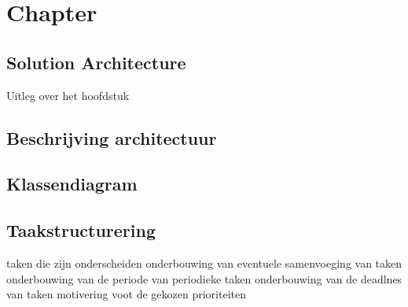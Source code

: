 \chapter{Chapter}
\section{Solution Architecture}
Uitleg over het hoofdstuk

\section{Beschrijving architectuur}


\section{Klassendiagram}


\section{Taakstructurering}
taken die zijn onderscheiden
onderbouwing van eventuele samenvoeging van taken
onderbouwing van de periode van periodieke taken
onderbouwing van de deadlnes van taken
motivering voot de gekozen prioriteiten

